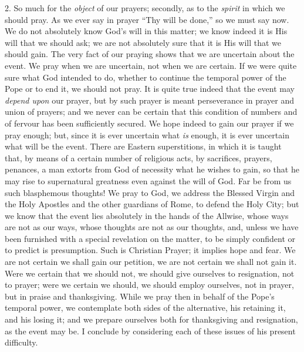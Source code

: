 2. So much for the \emph{object} of our prayers;
secondly, as to the \emph{spirit} in which we should
pray. As we ever say in prayer ``Thy will be
done,'' so we must say now. We do not absolutely know
God's will in this matter; we know indeed it is His will
that we should ask; we are not absolutely sure that it is
His will that we should gain. The very fact of our
praying shows that we are uncertain about the event. We
pray when we are uncertain, not when we are certain. If
we were quite sure what God intended to do, whether to
continue the temporal power of the Pope or to end it, we
should not pray. It is quite true indeed that the event
may \emph{depend upon} our prayer, but by such prayer is
meant perseverance in prayer and union of prayers; and we
never can be certain that this condition of numbers and
of fervour has been sufficiently secured. We hope indeed
to gain our prayer if we pray enough; but, since it is
ever uncertain what \emph{is} enough, it is ever
uncertain what will be the event. There are Eastern
superstitions, in which it is taught that, by means of a
certain number of religious acts, by sacrifices, prayers,
penances, a man extorts from God of necessity what he
wishes to gain, so that he may rise to supernatural
greatness even against the will of God. Far be from us
such blasphemous thoughts! We pray to God, we address the Blessed Virgin and the Holy Apostles and the other
guardians of Rome, to defend the Holy City; but we know
that the event lies absolutely in the hands of the
Allwise, whose ways are not as our ways, whose thoughts
are not as our thoughts, and, unless we have been
furnished with a special revelation on the matter, to be
simply confident or to predict is presumption. Such is
Christian Prayer; it implies hope and fear. We are not
certain we shall gain our petition, we are not certain we
shall not gain it. Were we certain that we should not, we
should give ourselves to resignation, not to prayer; were
we certain we should, we should employ ourselves, not in
prayer, but in praise and thanksgiving. While we pray
then in behalf of the Pope's temporal power, we
contemplate both sides of the alternative, his retaining
it, and his losing it; and we prepare ourselves both for
thanksgiving and resignation, as the event may be. I
conclude by considering each of these issues of his
present difficulty.

